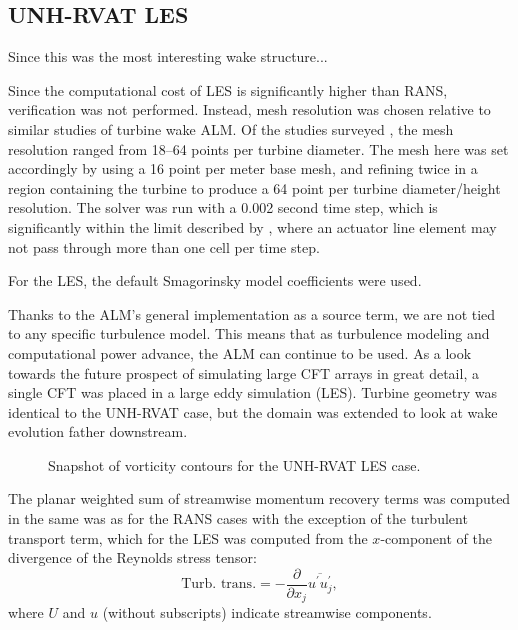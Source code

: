 \subsection{UNH-RVAT LES}

Since this was the most interesting wake structure...

Since the computational cost of LES is significantly higher than RANS,
verification was not performed. Instead, mesh resolution was chosen relative to
similar studies of turbine wake ALM. Of the studies surveyed
\cite{Shamsoddin2014,Archer2013,Martinez-Tossas2015a,Troldborg2007}, the mesh
resolution ranged from 18--64 points per turbine diameter. The mesh here was set
accordingly by using a 16 point per meter base mesh, and refining twice in a
region containing the turbine to produce a 64 point per turbine diameter/height
resolution. The solver was run with a 0.002 second time step, which is
significantly within the limit described by \cite{Martinez-Tossas2015}, where an
actuator line element may not pass through more than one cell per time step.

For the LES, the default Smagorinsky model coefficients were used. 

Thanks to the ALM's general implementation as a source term, we are not tied to
any specific turbulence model. This means that as turbulence modeling and
computational power advance, the ALM can continue to be used. As a look towards
the future prospect of simulating large CFT arrays in great detail, a single CFT
was placed in a large eddy simulation (LES). Turbine geometry was identical to
the UNH-RVAT case, but the domain was extended to look at wake evolution father
downstream.

\begin{figure}
    \caption{Snapshot of vorticity contours for the UNH-RVAT LES case.}
    
    \label{RVAT-LES}
\end{figure}



The planar weighted sum of streamwise momentum recovery terms was computed in
the same was as for the RANS cases with the exception of the turbulent transport
term, which for the LES was computed from the $x$-component of the divergence of
the Reynolds stress tensor:
\begin{equation}
    \text{Turb. trans.} = -\frac{\partial}{\partial x_j}
    \overline{u^\prime u^\prime_j},
\end{equation}
where $U$ and $u$ (without subscripts) indicate streamwise components.

